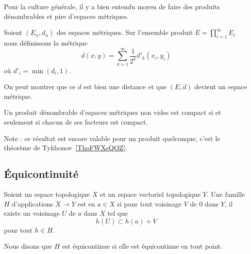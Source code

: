 Pour la culture générale, il y a bien entendu moyen de faire des produits dénombrables et pire d'espaces métriques.
\begin{definition}
	Soient \( (E_n,d_n)\) des espaces métriques. Sur l'ensemble produit \( E=\prod_{i=1}^{\infty}E_i\) nous définissons la métrique
	\begin{equation}
		d(x,y)=\sum_{k=1}^{\infty}\frac{1}{ 2^k }d'_k(x_i,y_i)
	\end{equation}
	où \( d'_i=\min(d_i,1)\).
\end{definition}
On peut montrer que ce \( d\) est bien une distance et que \( (E,d)\) devient un espace métrique.

\begin{theorem} \label{ThoKKBooNaZgoO}  %
	Un produit dénombrable d'espaces métriques non vides est compact si et seulement si chacun de ses facteurs est compact.
\end{theorem}
Note : ce résultat est encore valable pour un produit quelconque, c'est le théorème de Tykhonov~\ref{ThoFWXsQOZ}.

\subsection{Équicontinuité}

\begin{definition}        \label{DEFooDHQDooFfIvsX}
	Soient un espace topologique \( X\) et un espace vectoriel topologique \( Y\). Une famille \( H\) d'applications \( X\to Y\) est  en \( a\in X\) si pour tout voisinage \( V\) de \( 0\) dans \( Y\), il existe un voisinage \( U\) de \( a\) dans \( X\) tel que
	\begin{equation}
		h(U)\subset h(a)+V
	\end{equation}
	pour tout \( h\in H\).

	Nous disons que \( H\) est équicontinue si elle est équicontinue en tout point.
\end{definition}

